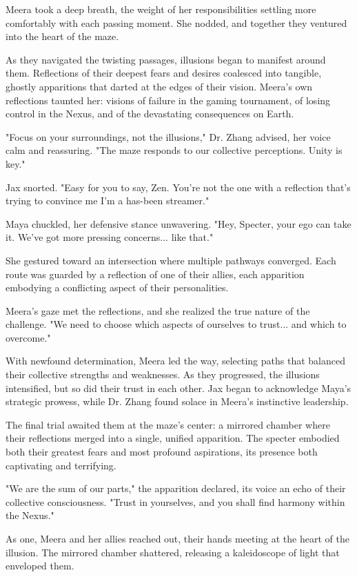\documentclass[12pt]{report}  %
\begin{document}
Meera took a deep breath, the weight of her responsibilities settling
more comfortably with each passing moment. She nodded, and together they
ventured into the heart of the maze.

As they navigated the twisting passages, illusions began to manifest
around them. Reflections of their deepest fears and desires coalesced
into tangible, ghostly apparitions that darted at the edges of their
vision. Meera's own reflections taunted her: visions of failure in the
gaming tournament, of losing control in the Nexus, and of the
devastating consequences on Earth.

"Focus on your surroundings, not the illusions," Dr. Zhang advised, her
voice calm and reassuring. "The maze responds to our collective
perceptions. Unity is key."

Jax snorted. "Easy for you to say, Zen. You're not the one with a
reflection that's trying to convince me I'm a has-been streamer."

Maya chuckled, her defensive stance unwavering. "Hey, Specter, your ego
can take it. We've got more pressing concerns... like that."

She gestured toward an intersection where multiple pathways converged.
Each route was guarded by a reflection of one of their allies, each
apparition embodying a conflicting aspect of their personalities.

Meera's gaze met the reflections, and she realized the true nature of
the challenge. "We need to choose which aspects of ourselves to trust...
and which to overcome."

With newfound determination, Meera led the way, selecting paths that
balanced their collective strengths and weaknesses. As they progressed,
the illusions intensified, but so did their trust in each other. Jax
began to acknowledge Maya's strategic prowess, while Dr. Zhang found
solace in Meera's instinctive leadership.

The final trial awaited them at the maze's center: a mirrored chamber
where their reflections merged into a single, unified apparition. The
specter embodied both their greatest fears and most profound
aspirations, its presence both captivating and terrifying.

"We are the sum of our parts," the apparition declared, its voice an
echo of their collective consciousness. "Trust in yourselves, and you
shall find harmony within the Nexus."

As one, Meera and her allies reached out, their hands meeting at the
heart of the illusion. The mirrored chamber shattered, releasing a
kaleidoscope of light that enveloped them.
\end{document}
